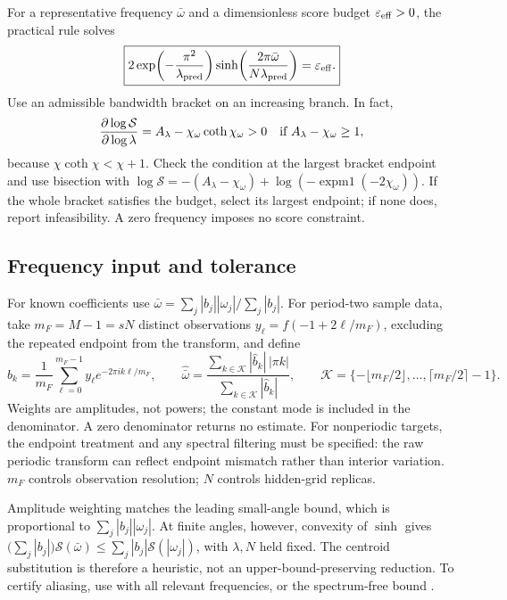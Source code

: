 For a representative frequency $\bar\omega$ and a dimensionless score budget
$\varepsilon_{\rm eff}>0$, the practical rule solves
\begin{equation}
 \boxed{2\exp\!\left(-\frac{\pi^2}{\lambda_{\rm pred}}\right)
 \sinh\!\left(\frac{2\pi\bar\omega}{N\lambda_{\rm pred}}\right)
 =\varepsilon_{\rm eff}.}
 \label{eq:bandwidth-prescription}
\end{equation}
Use an admissible bandwidth bracket on an increasing branch. In fact,
\begin{equation}
 \frac{\partial\log\mathcal S}{\partial\log\lambda}
 =A_\lambda-\chi_\omega\coth\chi_\omega>0
 \quad\hbox{if }A_\lambda-\chi_\omega\ge1,
 \label{eq:bandwidth-monotonicity}
\end{equation}
because $\chi\coth\chi<\chi+1$. Check the condition at the largest bracket endpoint and use bisection with
$\log\mathcal S=-(A_\lambda-\chi_\omega)
 +\log(-\operatorname{expm1}(-2\chi_\omega))$.
If the whole bracket satisfies the budget, select its largest endpoint;
if none does, report infeasibility. A zero frequency imposes no score constraint.

\subsection{Frequency input and tolerance}
For known coefficients use
$\bar\omega=\sum_j|b_j||\omega_j|/\sum_j|b_j|$.
For period-two sample data, take $m_F=M-1=sN$ distinct observations
$y_\ell=f(-1+2\ell/m_F)$, excluding the repeated endpoint from the transform,
and define
\begin{equation}
 \widehat b_k=\frac1{m_F}\sum_{\ell=0}^{m_F-1}
      y_\ell e^{-2\pi i k\ell/m_F},\qquad
 \widehat{\bar\omega}
 =\frac{\sum_{k\in\mathcal K}|\widehat b_k|\,|\pi k|}
        {\sum_{k\in\mathcal K}|\widehat b_k|},\qquad
 \mathcal K=\{-\lfloor m_F/2\rfloor,\ldots,\lceil m_F/2\rceil-1\}.
 \label{eq:bandwidth-frequency-estimate}
\end{equation}
Weights are amplitudes, not powers; the constant mode is included in the
denominator. A zero denominator returns no estimate. For nonperiodic targets,
the endpoint treatment and any spectral filtering must be specified: the raw
periodic transform can reflect endpoint mismatch rather than interior
variation. $m_F$ controls observation resolution; $N$ controls hidden-grid replicas.

Amplitude weighting matches the leading small-angle bound, which is
proportional to $\sum_j|b_j||\omega_j|$. At finite angles, however, convexity
of $\sinh$ gives
$\bigl(\sum_j|b_j|\bigr)\mathcal S(\bar\omega)
 \le\sum_j|b_j|\mathcal S(|\omega_j|)$,
with $\lambda,N$ held fixed. The centroid substitution is therefore a
heuristic, not an upper-bound-preserving reduction. To certify aliasing, use
 with all relevant frequencies, or the
spectrum-free bound .

